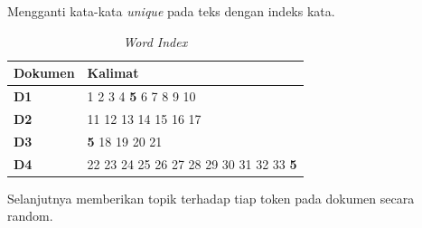 \noindent Mengganti kata-kata \textit{unique} pada teks dengan indeks kata.
\begin{table}[H]
	\caption{\textit{Word Index}}
	\centering
	\small
	\begin{adjustbox}{width=1\textwidth}
	\begin{tabular}{|p{3cm}|p{10cm}|}
		\hline
		\textbf{Dokumen} & \textbf{Kalimat} \\
		\hline
		\textbf{D1} & 1 2 3 4 \textbf{5} 6 7 8 9 10 \\
		\hline
		\textbf{D2} & 11 12 13 14 15 16 17 \\
		\hline
		\textbf{D3} & \textbf{5} 18 19 20 21 \\
		\hline
		\textbf{D4} & 22 23 24 25 26 27 28 29 30 31 32 33 \textbf{5} \\
		\hline
	\end{tabular}
	\end{adjustbox}
\end{table}
\noindent Selanjutnya memberikan topik terhadap tiap token pada dokumen secara random.

